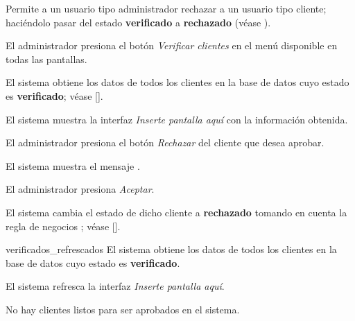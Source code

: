 %
%

{
  Permite a un usuario tipo administrador rechazar a un usuario tipo cliente;
  haciéndolo pasar del estado \textbf{verificado} a \textbf{rechazado} (véase
  ).

  \begin{trayectoriaPrincipal}

    \item El administrador presiona el botón \textit{Verificar clientes}
      en el menú disponible en todas las pantallas.

    \item El sistema obtiene los datos de todos los clientes en la base de datos
    cuyo estado es \textbf{verificado}; véase
    [].

    \item El sistema muestra la interfaz \textit{Inserte pantalla aquí} con la
      información obtenida.

    \item El administrador presiona el botón \textit{Rechazar} del cliente que
      desea aprobar.

    \item El sistema muestra el mensaje .

    \item El administrador presiona \textit{Aceptar}.

    \item El sistema cambia el estado de dicho cliente a \textbf{rechazado}
      tomando en cuenta la regla de negocios ;
      véase [].

    \item [verificados_refrescados] El sistema obtiene los datos de todos los
      clientes en la base de datos cuyo estado es \textbf{verificado}.

    \item El sistema refresca la interfaz \textit{Inserte pantalla aquí}.

  \end{trayectoriaPrincipal}

  \begin{trayectoriaAlternativa}
    {No hay clientes listos para ser aprobados en el sistema.}


\end{trayectoriaAlternativa}}

